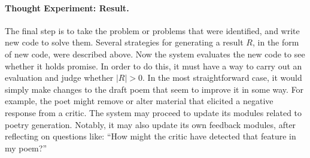 
\paragraph{Thought Experiment: Result.} 

The final step is to take the problem or problems that were
identified, and write new code to solve them.  Several strategies for
generating a result $R$, in the form of new code, were described
above.  Now the system evaluates the new code to see whether it holds
promise.  In order to do this, it must have a way to carry out an
evaluation and judge whether $|R|>0$.  In the most straightforward
case, it would simply make changes to the draft poem that seem to
improve it in some way.  For example, the poet might remove or alter material that
elicited a negative response from a critic.  The system may proceed to
update its modules related to poetry generation.  Notably, it may also update its own
feedback modules, after reflecting on questions like: ``How might the
critic have detected that feature in my poem?''
